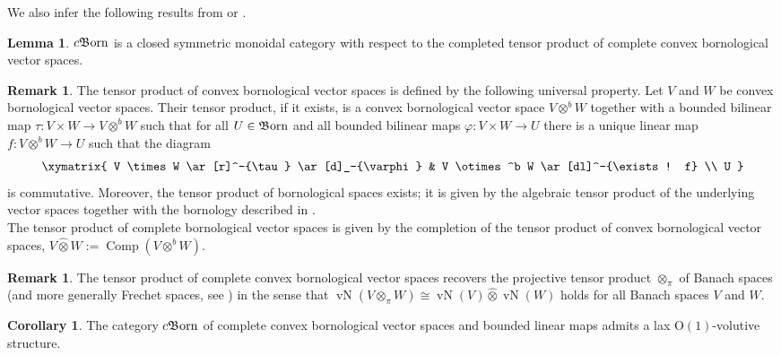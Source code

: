 \documentclass{article}
\newcommand{\Born}{\mathfrak{B}\hspace{-0.05cm}\operatorname{orn}}%
\newcommand{\cBorn}{c\mathfrak{B}\hspace{-0.05cm}\operatorname{orn}}%
\newcommand{\vN}{\operatorname{vN}}%
\newcommand{\Oone}{\operatorname{O(1)}}
\numberwithin{equation}{section}
\theoremstyle{definition}
\newtheorem{lemma}[definition]{Lemma}
\newtheorem{remark}[definition]{Remark}
\newtheorem{corollary}[definition]{Corollary}
\theoremstyle{theorem}
\begin{document}
We also infer the following results from \cite[Proposition 1.111]{Meyer2007Local} or \cite[Sections 2.4-2.6]{aretz2025functorialitybornological}.
\begin{lemma}\label{Lemma: Bornological vector spaces and closed symmetric monoidal structures}
    $\cBorn$ is a closed symmetric monoidal category with respect to the completed tensor product of complete convex bornological vector spaces.
\end{lemma}
\begin{remark}
    The tensor product of convex bornological vector spaces is defined by the following universal property. Let $V$ and $W$ be convex bornological 
    vector spaces. Their tensor product, if it exists, is a convex bornological vector space $V \otimes^b W$ together with a bounded bilinear map 
    $\tau \colon V \times W \to V \otimes^b W$ such that for all $U \in \Born$ and all bounded bilinear maps $\varphi \colon V \times W \to U$ 
    there is a unique linear map $f \colon V \otimes^b W \to U$ such that the diagram 
    \begin{equation}
        \begin{aligned}
        \xymatrix{
            V \times W \ar[r]^-{\tau} \ar[d]_-{\varphi} & V \otimes^b W \ar[dl]^-{\exists ! f}  \\
            U 
        }
        \end{aligned}
    \end{equation}
    is commutative. Moreover, the tensor product of bornological spaces exists; it is given by the algebraic tensor product of the underlying 
    vector spaces together with the bornology described in \cite[Proposition 2.4.2]{aretz2025functorialitybornological}.\\
    The tensor product of complete bornological vector spaces is given by the completion of the tensor product of convex bornological vector spaces, 
    $V \hat{\otimes} W := \operatorname{Comp}(V \otimes^b W)$.
\end{remark}
\begin{remark}
    The tensor product of complete convex bornological vector spaces recovers the projective tensor product $\otimes_{\pi}$ of Banach spaces (and more generally 
    Frechet spaces, see \cite[Definition 1.15 \& Theorem 1.87]{Meyer2007Local}) in the sense that $\vN(V \otimes_{\pi} W) \cong \vN(V) \hat{\otimes} \vN(W)$ holds 
    for all Banach spaces $V$ and $W$.
\end{remark}
\begin{corollary}\label{Corollary: bornological vector spaces are lax volutive}
    The category $\cBorn$ of complete convex bornological vector spaces and bounded linear maps admits a lax $\Oone$-volutive structure.
\end{corollary}
\end{document}
